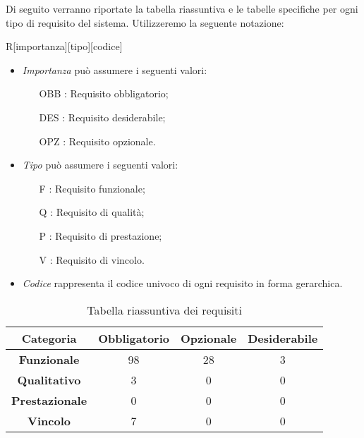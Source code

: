 Di seguito verranno riportate la tabella riassuntiva e le tabelle specifiche per ogni tipo di requisito del sistema. Utilizzeremo la seguente notazione:

R[importanza][tipo][codice]

\begin{itemize}
	\item \textit{Importanza} può assumere i seguenti valori:
	\begin{itemize}
		\item [OBB]: Requisito obbligatorio;
		\item [DES]: Requisito desiderabile;
		\item [OPZ]: Requisito opzionale.
	\end{itemize}
	
	\item \textit{Tipo} può assumere i seguenti valori:
	\begin{itemize}
		\item [F] : Requisito funzionale;
		\item [Q] : Requisito di qualità;
		\item [P] : Requisito di prestazione;
		\item [V] : Requisito di vincolo.
	\end{itemize}
	
	\item \textit{Codice} rappresenta il codice univoco di ogni requisito in forma gerarchica.
\end{itemize}

	\begin{table}[h]
		\centering
		\begin{tabular}{|c|c|c|c|}
			\toprule
			
			\textbf{Categoria} & \textbf{Obbligatorio} & \textbf{Opzionale} & \textbf{Desiderabile} \\
			
			\midrule
			\textbf{Funzionale} & 98 & 28 & 3 \\ \midrule
			\textbf{Qualitativo} & 3 & 0 & 0 \\  \midrule
			\textbf{Prestazionale} & 0 & 0 & 0 \\ \midrule
			\textbf{Vincolo} & 7 & 0 & 0  \\
			
			\bottomrule
			
		\end{tabular}
		\caption{Tabella riassuntiva dei requisiti}
		
	\end{table}
	\newpage


\newpage


\newpage


\newpage


\newpage

%

